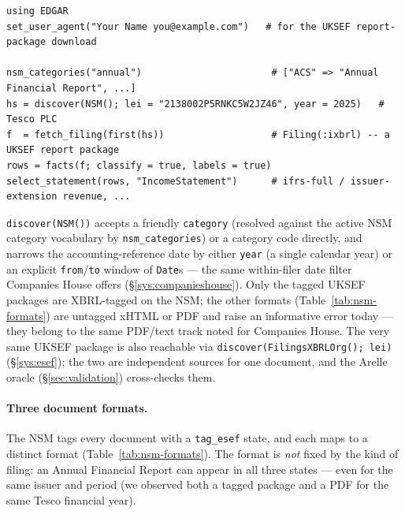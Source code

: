 \documentclass[11pt,a4paper]{report}
\begin{document}
\begin{lstlisting}
using EDGAR
set_user_agent("Your Name you@example.com")   # for the UKSEF report-package download

nsm_categories("annual")                       # ["ACS" => "Annual Financial Report", ...]
hs = discover(NSM(); lei = "2138002P5RNKC5W2JZ46", year = 2025)   # Tesco PLC
f  = fetch_filing(first(hs))                   # Filing(:ixbrl) -- a UKSEF report package
rows = facts(f; classify = true, labels = true)
select_statement(rows, "IncomeStatement")      # ifrs-full / issuer-extension revenue, ...
\end{lstlisting}

\noindent \texttt{discover(NSM())} accepts a friendly \texttt{category} (resolved against the active
NSM category vocabulary by \texttt{nsm\_categories}) or a category code directly, and narrows the
accounting-reference date by either \texttt{year} (a single calendar year) or an explicit
\texttt{from}/\texttt{to} window of \texttt{Date}s --- the same within-filer date filter Companies
House offers (\S\ref{sys:companieshouse}). Only the tagged UKSEF packages are XBRL-tagged on the NSM;
the other formats (Table~\ref{tab:nsm-formats}) are untagged xHTML or PDF and raise an informative
error today --- they belong to the same PDF/text track noted for Companies House. The very same UKSEF
package is also reachable via \texttt{discover(FilingsXBRLOrg(); lei)} (\S\ref{sys:esef}); the two are
independent sources for one document, and the Arelle oracle (\S\ref{sec:validation}) cross-checks them.

\paragraph{Three document formats.} The NSM tags every document with a \texttt{tag\_esef} state, and
each maps to a distinct format (Table~\ref{tab:nsm-formats}). The format is \emph{not} fixed by the
kind of filing: an Annual Financial Report can appear in all three states --- even for the same issuer
and period (we observed both a tagged package and a PDF for the same Tesco financial year).
\end{document}

